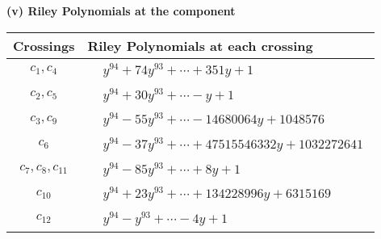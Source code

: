 \documentclass[1p]{elsarticle_modified}
\theoremstyle{definition}
\begin{document}
\flushleft \textbf{(v) Riley Polynomials at the component}\newline \\
\begin{tabular}{m{50pt}|m{274pt}}
Crossings & \hspace{64pt}Riley Polynomials at each crossing \\
\hline $$\begin{aligned}c_{1},c_{4}\end{aligned}$$&$\begin{aligned}
&y^{94}+74 y^{93}+\cdots+351 y+1
\end{aligned}$\\
\hline $$\begin{aligned}c_{2},c_{5}\end{aligned}$$&$\begin{aligned}
&y^{94}+30 y^{93}+\cdots- y+1
\end{aligned}$\\
\hline $$\begin{aligned}c_{3},c_{9}\end{aligned}$$&$\begin{aligned}
&y^{94}-55 y^{93}+\cdots-14680064 y+1048576
\end{aligned}$\\
\hline $$\begin{aligned}c_{6}\end{aligned}$$&$\begin{aligned}
&y^{94}-37 y^{93}+\cdots+47515546332 y+1032272641
\end{aligned}$\\
\hline $$\begin{aligned}c_{7},c_{8},c_{11}\end{aligned}$$&$\begin{aligned}
&y^{94}-85 y^{93}+\cdots+8 y+1
\end{aligned}$\\
\hline $$\begin{aligned}c_{10}\end{aligned}$$&$\begin{aligned}
&y^{94}+23 y^{93}+\cdots+134228996 y+6315169
\end{aligned}$\\
\hline $$\begin{aligned}c_{12}\end{aligned}$$&$\begin{aligned}
&y^{94}- y^{93}+\cdots-4 y+1
\end{aligned}$\\
\hline
\end{tabular}\\~\\
\end{document}
